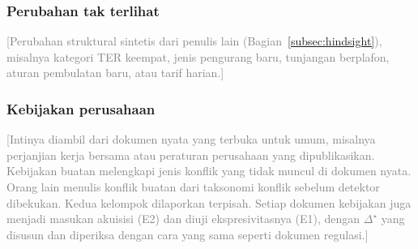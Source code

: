 \documentclass[journal,a4paper]{IEEEtran}
\newcommand{\emas}{\star}
\newif\ifrancangan \rancangantrue
\newcommand{\isian}[1]{\ifrancangan\textcolor{gray}{[#1]}\fi}
\begin{document}
\subsubsection{Perubahan tak terlihat}
\isian{Perubahan struktural sintetis dari penulis lain (Bagian~\ref{subsec:hindsight}), misalnya kategori TER keempat, jenis pengurang baru, tunjangan berplafon, aturan pembulatan baru, atau tarif harian.}

\subsubsection{Kebijakan perusahaan}
\isian{Intinya diambil dari dokumen nyata yang terbuka untuk umum, misalnya perjanjian kerja bersama atau peraturan perusahaan yang dipublikasikan. Kebijakan buatan melengkapi jenis konflik yang tidak muncul di dokumen nyata. Orang lain menulis konflik buatan dari taksonomi konflik sebelum detektor dibekukan. Kedua kelompok dilaporkan terpisah. Setiap dokumen kebijakan juga menjadi masukan akuisisi (E2) dan diuji ekspresivitasnya (E1), dengan $\Delta^{\emas}$ yang disusun dan diperiksa dengan cara yang sama seperti dokumen regulasi.}
\end{document}
